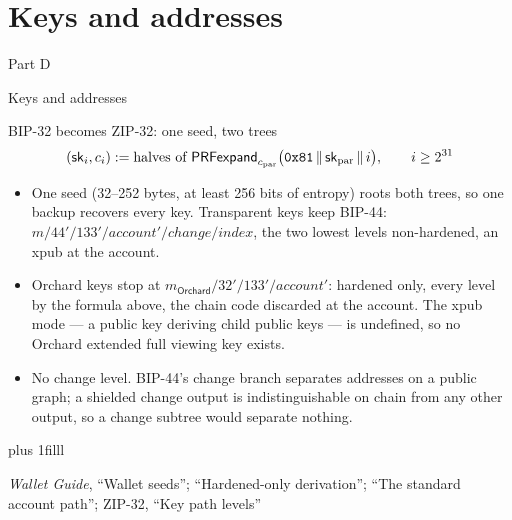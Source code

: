 \documentclass[aspectratio=169,11pt]{beamer}
\newcommand{\divider}[2]{%
  \section{#2}
  \begin{frame}[plain,t]
  \vspace*{14mm}
  {\small\color{arb}#1\par}
  \vskip8mm
  \begin{minipage}{0.88\textwidth}\raggedright
    \fontsize{27}{31}\selectfont #2\par
  \end{minipage}
  \end{frame}}
\newcommand{\src}[1]{\par\vskip0pt plus 1filll
  {\fontsize{6}{7.2}\selectfont\color{arbdim}\raggedright #1\par}}
\begin{document}
\divider{Part D}{Keys and addresses}

\begin{frame}{BIP-32 becomes ZIP-32: one seed, two trees}
\[
(\mathsf{sk}_i, c_i) := \text{halves of }
\mathsf{PRFexpand}_{c_{\mathrm{par}}}\bigl(\mathtt{0x81}\,\|\,
\mathsf{sk}_{\mathrm{par}}\,\|\,i\bigr),
\qquad i \ge 2^{31}
\]
\begin{itemize}
  \item One seed (32--252 bytes, at least 256 bits of entropy) roots both
    trees, so one backup recovers every key. Transparent keys keep
    BIP-44: $m/44'/133'/\mathit{account}'/\mathit{change}/\mathit{index}$,
    the two lowest levels non-hardened, an xpub at the account.
  \item Orchard keys stop at
    $m_{\mathsf{Orchard}}/32'/133'/\mathit{account}'$: hardened only,
    every level by the formula above, the chain code discarded at the
    account. The xpub mode --- a public key deriving child public keys ---
    is undefined, so no Orchard extended full viewing key exists.
  \item No change level. BIP-44's change branch separates addresses on a
    public graph; a shielded change output is indistinguishable on chain
    from any other output, so a change subtree would separate nothing.
\end{itemize}
\src{\emph{Wallet Guide}, ``Wallet seeds''; ``Hardened-only derivation'';
``The standard account path''; ZIP-32, ``Key path levels''}
\end{frame}
\end{document}
